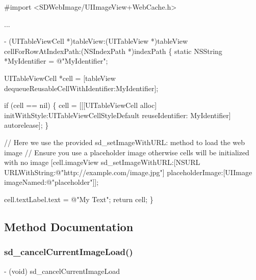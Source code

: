 \begin{DoxyCode}
\textcolor{preprocessor}{#import <SDWebImage/UIImageView+WebCache.h>}

...

- (UITableViewCell *)tableView:(UITableView *)tableView cellForRowAtIndexPath:(NSIndexPath *)indexPath
\{
    \textcolor{keyword}{static} NSString *MyIdentifier = \textcolor{stringliteral}{@"MyIdentifier"};
 
    UITableViewCell *cell = [tableView dequeueReusableCellWithIdentifier:MyIdentifier];
 
    \textcolor{keywordflow}{if} (cell == nil) \{
        cell = [[[UITableViewCell alloc] initWithStyle:UITableViewCellStyleDefault reuseIdentifier:
      MyIdentifier]
                 autorelease];
    \}
 
    \textcolor{comment}{// Here we use the provided sd\_setImageWithURL: method to load the web image}
    \textcolor{comment}{// Ensure you use a placeholder image otherwise cells will be initialized with no image}
    [cell.imageView sd\_setImageWithURL:[NSURL URLWithString:\textcolor{stringliteral}{@"http://example.com/image.jpg"}]
                      placeholderImage:[UIImage imageNamed:\textcolor{stringliteral}{@"placeholder"}]];
 
    cell.textLabel.text = \textcolor{stringliteral}{@"My Text"};
    \textcolor{keywordflow}{return} cell;
\}
\end{DoxyCode}
 

\subsection{Method Documentation}
\mbox{\label{category_u_i_image_view_07_web_cache_08_a5ff7ec2145bd69460982ea6bd3b6026e}} 
\subsubsection{\texorpdfstring{sd\+\_\+cancel\+Current\+Image\+Load()}{sd\_cancelCurrentImageLoad()}\hspace{0.1cm}{\footnotesize\ttfamily [1/3]}}
{\footnotesize\ttfamily -\/ (void) sd\+\_\+cancel\+Current\+Image\+Load \begin{DoxyParamCaption}{ }\end{DoxyParamCaption}}


